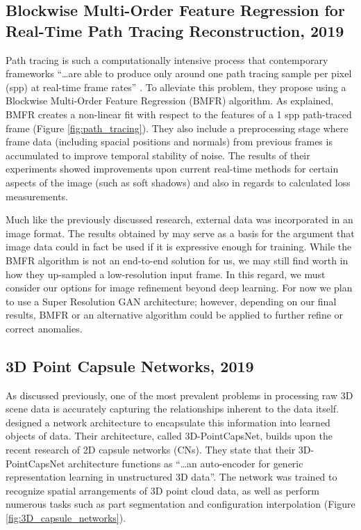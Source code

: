 \documentclass{article}
\begin{document}
\subsection*{Blockwise Multi-Order Feature Regression for Real-Time Path Tracing Reconstruction, 2019}
\nocite{path_tracing}
Path tracing is such a computationally intensive process that contemporary
frameworks
``\dots are able to produce only around one path tracing sample per pixel (spp)
at real-time frame rates'' \cite{path_tracing}.
To alleviate this problem, they propose using a
Blockwise Multi-Order Feature Regression (BMFR) algorithm.
As explained, BMFR creates a non-linear fit with respect to the
features of a 1 spp path-traced frame (Figure \ref{fig:path_tracing}).
They also include a preprocessing stage where frame data (including
spacial positions and normals) from previous frames is accumulated to improve
temporal stability of noise. The results of their experiments showed
improvements upon current real-time methods for certain aspects of the image
(such as soft shadows) and also in regards to calculated loss measurements.

Much like the previously discussed research, external data was incorporated
in an image format. The results obtained by \cite{path_tracing}
may serve as a basis
for the argument that image data could in fact be used if it is expressive enough
for training.
While the BMFR algorithm is not an end-to-end solution for us, we may still find
worth in how they up-sampled a low-resolution input frame. In this regard,
we must consider our options for image refinement beyond deep learning.
For now we plan to use a Super Resolution GAN architecture; however, depending on
our final results, BMFR or an alternative algorithm could be
applied to further refine or correct anomalies.

\subsection*{3D Point Capsule Networks, 2019}
\nocite{3D_capsule_networks}
As discussed previously, one of the most prevalent problems in processing raw 3D
scene data is accurately capturing the relationships inherent to the data itself.
\cite{3D_capsule_networks} designed a network architecture to
encapsulate this information into
learned objects of data. Their architecture, called 3D-PointCapsNet,
builds upon the recent research of 2D capsule networks (CNs).
They state that their 3D-PointCapsNet architecture functions as
``\dots an auto-encoder for generic representation
learning in unstructured 3D data''.
The network was trained
to recognize spatial arrangements of 3D point cloud data, as well as perform
numerous tasks such as part segmentation and configuration interpolation
(Figure \ref{fig:3D_capsule_networks}).
\end{document}
